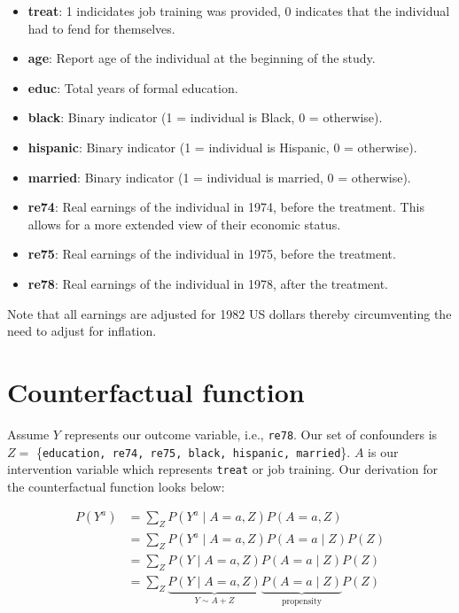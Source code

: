 \documentclass[12pt]{article}
\begin{document}
\begin{itemize}[itemsep=-0.25em]
    \item \textbf{treat}: 1 indicidates job training was provided, 0 indicates that the individual had to fend for themselves.
    \item \textbf{age}: Report age of the individual at the beginning of the study.
    \item \textbf{educ}: Total years of formal education.
    \item \textbf{black}: Binary indicator (1 = individual is Black, 0 = otherwise).
    \item \textbf{hispanic}: Binary indicator (1 = individual is Hispanic, 0 = otherwise).
    \item \textbf{married}: Binary indicator (1 = individual is married, 0 = otherwise).
    \item \textbf{re74}: Real earnings of the individual in 1974, before the treatment. This allows for a more extended view of their economic status.
    \item \textbf{re75}: Real earnings of the individual in 1975, before the treatment.
    \item \textbf{re78}: Real earnings of the individual in 1978, after the treatment.
\end{itemize}

Note that all earnings are adjusted for 1982 US dollars thereby circumventing the need to adjust for inflation.

\section{Counterfactual function} \label{sec:counterfactual}

Assume $Y$ represents our outcome variable, i.e., {\tt re78}. Our set of confounders is $Z=$ \{{\tt education, re74, re75, black, hispanic, married}\}. $A$ is our intervention variable which represents {\tt treat} or job training. Our derivation for the counterfactual function looks below:

\begin{align}
P(Y^a) 
       &= \sum_Z P(Y^a \mid A=a, Z) P(A=a, Z) \tag{1} \\
       &= \sum_Z P(Y^a \mid A=a, Z) P(A=a \mid Z) P(Z) \tag{2} \\
       &= \sum_Z P(Y \mid A=a, Z) P(A=a \mid Z) P(Z) \tag{3} \\
       &= \sum_Z \underbrace{P(Y \mid A=a, Z)}_{Y \sim A + Z} \underbrace{P(A=a \mid Z)}_{\text{propensity}} P(Z) \tag{4}
\end{align}
\end{document}
